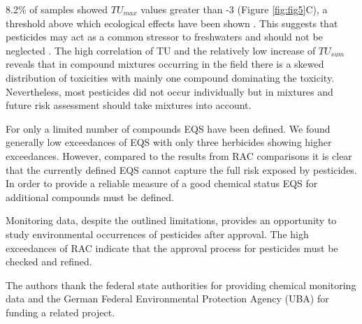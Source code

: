 \documentclass[journal=esthag,manuscript=article]{achemso}
\begin{document}
8.2\% of samples showed $TU_{max}$ values greater than -3 (Figure \ref{fig:fig5}C), a threshold above which ecological effects have been shown \citep{schafer_thresholds_2012}.
This suggests that pesticides may act as a common stressor to freshwaters and should not be neglected \citep{schafer_contribution_2016}.
%
%
The high correlation of TU and the relatively low increase of $TU_{sum}$ reveals that in compound mixtures occurring in the field there is a skewed distribution of toxicities with mainly one compound dominating the toxicity.
Nevertheless, most pesticides did not occur individually but in mixtures \cite{schreiner_pesticide_2016} and future risk assessment should take mixtures into account.
%
%

For only a limited number of compounds EQS have been defined. 
We found generally low exceedances of EQS with only three herbicides showing higher exceedances.
However, compared to the results from RAC comparisons it is clear that the currently defined EQS cannot capture the full risk exposed by pesticides.
In order to provide a reliable measure of a good chemical status EQS for additional compounds must be defined.
%
%

Monitoring data, despite the outlined limitations, provides an opportunity to study environmental occurrences of pesticides after approval.
The high exceedances of RAC indicate that the approval process for pesticides must be checked and refined.




\begin{acknowledgement}
The authors thank the federal state authorities for providing chemical monitoring data and the German Federal Environmental Protection Agency (UBA) for funding a related project. 
%
%
\end{acknowledgement}
\end{document}
